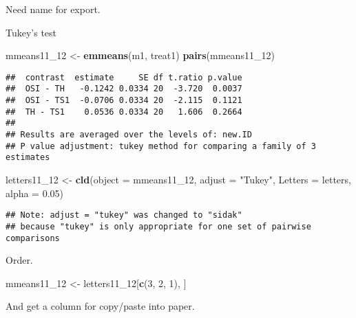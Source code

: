 \documentclass[
]{article}
\newenvironment{Shaded}{\begin{snugshade}}{\end{snugshade}}
\newcommand{\AttributeTok}[1]{\textcolor[rgb]{0.13,0.29,0.53}{#1}}
\newcommand{\DecValTok}[1]{\textcolor[rgb]{0.00,0.00,0.81}{#1}}
\newcommand{\FloatTok}[1]{\textcolor[rgb]{0.00,0.00,0.81}{#1}}
\newcommand{\FunctionTok}[1]{\textcolor[rgb]{0.13,0.29,0.53}{\textbf{#1}}}
\newcommand{\NormalTok}[1]{#1}
\newcommand{\OtherTok}[1]{\textcolor[rgb]{0.56,0.35,0.01}{#1}}
\newcommand{\SpecialCharTok}[1]{\textcolor[rgb]{0.81,0.36,0.00}{\textbf{#1}}}
\newcommand{\StringTok}[1]{\textcolor[rgb]{0.31,0.60,0.02}{#1}}
\begin{document}
Need name for export.

Tukey's test

\begin{Shaded}
\begin{Highlighting}[]
\NormalTok{mmeans11\_12 }\OtherTok{\textless{}{-}} \FunctionTok{emmeans}\NormalTok{(m1, }\StringTok{\textquotesingle{}treat1\textquotesingle{}}\NormalTok{)}
\FunctionTok{pairs}\NormalTok{(mmeans11\_12)}
\end{Highlighting}
\end{Shaded}

\begin{verbatim}
##  contrast  estimate     SE df t.ratio p.value
##  OSI - TH   -0.1242 0.0334 20  -3.720  0.0037
##  OSI - TS1  -0.0706 0.0334 20  -2.115  0.1121
##  TH - TS1    0.0536 0.0334 20   1.606  0.2664
## 
## Results are averaged over the levels of: new.ID 
## P value adjustment: tukey method for comparing a family of 3 estimates
\end{verbatim}

\begin{Shaded}
\begin{Highlighting}[]
\NormalTok{letters11\_12 }\OtherTok{\textless{}{-}} \FunctionTok{cld}\NormalTok{(}\AttributeTok{object =}\NormalTok{ mmeans11\_12,}
                  \AttributeTok{adjust =} \StringTok{"Tukey"}\NormalTok{,}
                  \AttributeTok{Letters =}\NormalTok{ letters,}
                  \AttributeTok{alpha =} \FloatTok{0.05}\NormalTok{)}
\end{Highlighting}
\end{Shaded}

\begin{verbatim}
## Note: adjust = "tukey" was changed to "sidak"
## because "tukey" is only appropriate for one set of pairwise comparisons
\end{verbatim}

Order.

\begin{Shaded}
\begin{Highlighting}[]
\NormalTok{mmeans11\_12 }\OtherTok{\textless{}{-}}\NormalTok{ letters11\_12[}\FunctionTok{c}\NormalTok{(}\DecValTok{3}\NormalTok{, }\DecValTok{2}\NormalTok{, }\DecValTok{1}\NormalTok{), ]}
\end{Highlighting}
\end{Shaded}

And get a column for copy/paste into paper.

\begin{Shaded}
\end{Shaded}
\end{document}
